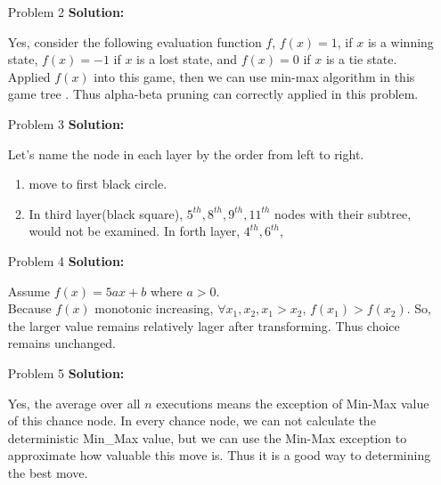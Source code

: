 \normalfont\documentclass[letterpaper,11pt]{article}
\begin{document}
\begin{enumerate}
\item[Problem 2]\textbf{Solution:}\par
	Yes, consider the following evaluation function $f$, $f(x) = 1$, if $x$ is a winning state, $f(x) = -1$ if $x$ is a lost state, and $f(x) = 0$ if $x$ is a tie state. Applied $f(x)$ into this game, then we can use min-max algorithm in this game tree . Thus alpha-beta pruning can correctly applied in this problem.
\item [Problem 3]\textbf{Solution:}\par
	Let's name the node in each layer by the order from left to right.
	\begin{enumerate}		
		\item move to first black circle.
		\item In third layer(black square), $5^{th}, 8^{th},9^{th}, 11^{th}$ nodes with their subtree, would not be examined. In forth layer, $4^{th}, 6^{th}$,
	\end{enumerate}	
\item[Problem 4]\textbf{Solution:}\par
	Assume $f(x) = 5ax + b$ where $a > 0$.\\
	Because $f(x)$ monotonic increasing, $\forall x_1,x_2, x_1 > x_2$, $f(x_1)> f(x_2)$. So, the larger value remains relatively lager after transforming. Thus choice remains unchanged.
\item [Problem 5]\textbf{Solution:}\par
	Yes, the average over all $n$ executions means the exception of Min-Max value of this chance node. In every chance node, we can not calculate the deterministic Min_Max value, but we can use the Min-Max exception to approximate how valuable this move is. Thus it is a good way to determining the best move.

\end{enumerate}
\end{document}
